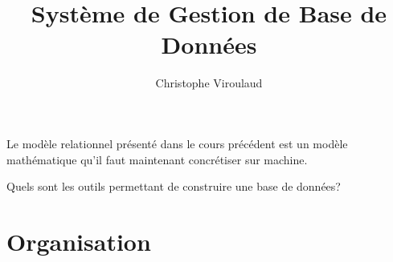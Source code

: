 \documentclass[svgnames,11pt]{beamer}
\author[]{Christophe Viroulaud}
\title{Système de Gestion de Base de Données}
\date{\framebox{\textbf{BDD 03}}}
\institute{Terminale - NSI}
\begin{document}
\begin{frame}
    \titlepage
\end{frame}
\begin{frame}
    \frametitle{}

    Le modèle relationnel présenté dans le cours précédent est un modèle mathématique qu'il faut maintenant concrétiser sur machine.
    \begin{framed}\centering
        Quels sont les outils permettant de construire une base de données?
    \end{framed}

\end{frame}
\section{Organisation}
\end{document}
